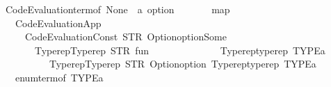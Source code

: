 \begin{isabellebody}
\ \ \ \ \ \ Code{\isacharunderscore}{\kern0pt}Evaluation{\isachardot}{\kern0pt}term{\isacharunderscore}{\kern0pt}of\ {\isacharparenleft}{\kern0pt}None\ {\isacharcolon}{\kern0pt}{\isacharcolon}{\kern0pt}\ {\isacharprime}{\kern0pt}a\ option{\isacharparenright}{\kern0pt}\ {\isacharhash}{\kern0pt}\isanewline
\ \ \ \ \ \ {\isacharparenleft}{\kern0pt}map\isanewline
\ \ \ \ \ \ \ \ {\isacharparenleft}{\kern0pt}Code{\isacharunderscore}{\kern0pt}Evaluation{\isachardot}{\kern0pt}App\isanewline
\ \ \ \ \ \ \ \ \ \ {\isacharparenleft}{\kern0pt}Code{\isacharunderscore}{\kern0pt}Evaluation{\isachardot}{\kern0pt}Const\ {\isacharparenleft}{\kern0pt}STR\ {\isacharprime}{\kern0pt}{\isacharprime}{\kern0pt}Option{\isachardot}{\kern0pt}option{\isachardot}{\kern0pt}Some{\isacharprime}{\kern0pt}{\isacharprime}{\kern0pt}{\isacharparenright}{\kern0pt}\isanewline
\ \ \ \ \ \ \ \ \ \ \ \ {\isacharparenleft}{\kern0pt}Typerep{\isachardot}{\kern0pt}Typerep\ {\isacharparenleft}{\kern0pt}STR\ {\isacharprime}{\kern0pt}{\isacharprime}{\kern0pt}fun{\isacharprime}{\kern0pt}{\isacharprime}{\kern0pt}{\isacharparenright}{\kern0pt}\isanewline
\ \ \ \ \ \ \ \ \ \ \ \ \ \ {\isacharbrackleft}{\kern0pt}Typerep{\isachardot}{\kern0pt}typerep\ TYPE{\isacharparenleft}{\kern0pt}{\isacharprime}{\kern0pt}a{\isacharparenright}{\kern0pt}{\isacharcomma}{\kern0pt}\isanewline
\ \ \ \ \ \ \ \ \ \ \ \ \ \ \ Typerep{\isachardot}{\kern0pt}Typerep\ {\isacharparenleft}{\kern0pt}STR\ {\isacharprime}{\kern0pt}{\isacharprime}{\kern0pt}Option{\isachardot}{\kern0pt}option{\isacharprime}{\kern0pt}{\isacharprime}{\kern0pt}{\isacharparenright}{\kern0pt}\ {\isacharbrackleft}{\kern0pt}Typerep{\isachardot}{\kern0pt}typerep\ TYPE{\isacharparenleft}{\kern0pt}{\isacharprime}{\kern0pt}a{\isacharparenright}{\kern0pt}{\isacharbrackright}{\kern0pt}{\isacharbrackright}{\kern0pt}{\isacharparenright}{\kern0pt}{\isacharparenright}{\kern0pt}{\isacharparenright}{\kern0pt}\isanewline
\ \ \ \ \ \ \ \ {\isacharparenleft}{\kern0pt}enum{\isacharunderscore}{\kern0pt}term{\isacharunderscore}{\kern0pt}of\ {\isacharparenleft}{\kern0pt}TYPE{\isacharparenleft}{\kern0pt}{\isacharprime}{\kern0pt}a{\isacharparenright}{\kern0pt}{\isacharparenright}{\kern0pt}\ {\isacharparenleft}{\kern0pt}{\isacharparenright}{\kern0pt}{\isacharparenright}{\kern0pt}{\isacharparenright}{\kern0pt}{\isacharparenright}{\kern0pt}{\isachardoublequoteclose}\isanewline
\isanewline
{}\isamarkupfalse%
%
\isadelimproof
\ %
\endisadelimproof
%
\isatagproof
\isacommand{{\isachardot}{\kern0pt}{\isachardot}{\kern0pt}}\isamarkupfalse%
%
\endisatagproof
{\isafoldproof}%

\end{isabellebody}
